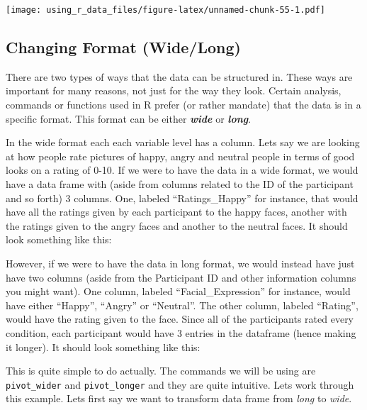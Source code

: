 \documentclass[
]{book}
\begin{document}
\texttt{[image: using\_r\_data\_files/figure-latex/unnamed-chunk-55-1.pdf]}

\hypertarget{changing-format-widelong}{%
\subsection{Changing Format (Wide/Long)}\label{changing-format-widelong}}

There are two types of ways that the data can be structured in.
These ways are important for many reasons, not just for the way they look.
Certain analysis, commands or functions used in R prefer (or rather mandate) that the data is in a specific format.
This format can be either \textbf{\emph{wide}} or \textbf{\emph{long}}.

In the wide format each each variable level has a column.
Lets say we are looking at how people rate pictures of happy, angry and neutral people in terms of good looks on a rating of 0-10.
If we were to have the data in a wide format, we would have a data frame with (aside from columns related to the ID of the participant and so forth) 3 columns.
One, labeled ``Ratings\_Happy'' for instance, that would have all the ratings given by each participant to the happy faces, another with the ratings given to the angry faces and another to the neutral faces.
It should look something like this:

However, if we were to have the data in long format, we would instead have just have two columns (aside from the Participant ID and other information columns you might want).
One column, labeled ``Facial\_Expression'' for instance, would have either ``Happy'', ``Angry'' or ``Neutral''.
The other column, labeled ``Rating'', would have the rating given to the face.
Since all of the participants rated every condition, each participant would have 3 entries in the dataframe (hence making it longer).
It should look something like this:

This is quite simple to do actually.
The commands we will be using are \texttt{pivot\_wider} and \texttt{pivot\_longer} and they are quite intuitive.
Lets work through this example.
Lets first say we want to transform data frame from \emph{long} to \emph{wide}.
\end{document}
